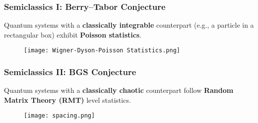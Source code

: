 \begin{frame}[plain]
    \frametitle{Semiclassics I: Berry–Tabor Conjecture}
    
    \begin{block}{}
    Quantum systems with a \textbf{classically integrable} counterpart  
    (e.g., a particle in a rectangular box) exhibit \textbf{Poisson statistics}.
    \end{block}

    \begin{figure}
        \texttt{[image: Wigner-Dyson-Poisson Statistics.png]}
    \end{figure}
\end{frame}

\begin{frame}[plain]
    \frametitle{Semiclassics II: BGS Conjecture}
    
    \begin{block}{}
    Quantum systems with a \textbf{classically chaotic} counterpart  
    follow \textbf{Random Matrix Theory (RMT)} level statistics.
    \end{block}

    \begin{figure}
        \texttt{[image: spacing.png]}
    \end{figure}
\end{frame}

